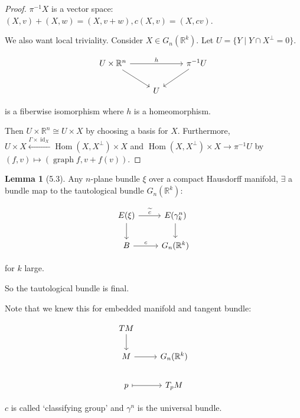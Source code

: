 \documentclass{article}
\theoremstyle{definition}
\newtheorem{lemma}[theorem]{Lemma}
\begin{document}
    \begin{proof}
        \(\pi ^{-1} X\) is a vector space: \((X,v)+(X,w) = (X,v+w), c(X,v) = (X,cv)\).

        We also want local triviality. Consider \(X\in G_n(\mathbb{R}^k)\). Let \(U = \{ Y \mid Y\cap X^{\perp} = 0\} \).
        
        \[
            \begin{tikzcd}
                U \times \mathbb{R}^n \ar[rr,"h"] \ar[rd] & & \pi ^{-1} U \ar[ld] \\ & U
            \end{tikzcd}
        \]

        is a fiberwise isomorphism where \(h\) is a homeomorphism.

        Then \(U \times \mathbb{R}^n \cong U \times X\) by choosing a basis for \(X\). Furthermore, \(U \times X \xleftarrow{\Gamma \times \operatorname{id}_{X}} \operatorname{Hom} (X, X^{\perp}) \times X\) and \(\operatorname{Hom} (X, X^{\perp}) \times X \to \pi ^{-1} U\) by \((f,v) \mapsto (\operatorname{graph} f, v + f(v))\).  
    \end{proof}

    \begin{lemma}
        [5.3] Any \(n\)-plane bundle \(\xi\) over a compact Hausdorff manifold, \(\exists\) a bundle map to the tautological bundle \(G_n(\mathbb{R}^k)\):

        \[
            \begin{tikzcd}
                E(\xi) \ar[r,"\widetilde{c}"] \ar[d] & E(\gamma^n_k) \ar[d] \\ B \ar[r,"c"] & G_n(\mathbb{R}^k)
            \end{tikzcd}
        \]

        for \(k\) large.

        So the tautological bundle is final.
    \end{lemma}

    Note that we knew this for embedded manifold and tangent bundle:

    \[
        \begin{tikzcd}
            TM \ar[d] \\ M \ar[r] & G_n(\mathbb{R}^k) \\ p \ar[r, mapsto] & T_p M
        \end{tikzcd}
    \]

    \(c\) is called `classifying group' and \(\gamma^n\) is the universal bundle.
\end{document}
